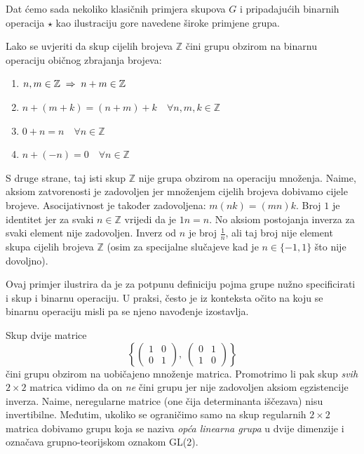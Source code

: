 Dat ćemo sada nekoliko klasičnih primjera skupova $G$ i pripadajućih
binarnih operacija $\star$ kao ilustraciju gore navedene široke primjene grupa.

\begin{primjer}[$\mathbb{Z}$, +]
 Lako se uvjeriti da skup cijelih brojeva $\mathbb{Z}$ čini grupu obzirom
 na binarnu operaciju običnog zbrajanja brojeva:
\begin{enumerate}
\item $n,m \in  \mathbb{Z} \;\Rightarrow\; n+m \in  \mathbb{Z}$
\item $n+(m+k)=(n+m)+k \quad \forall n,m,k \in \mathbb{Z}$
\item $0+n=n \quad \forall n\in\mathbb{Z}$ \quad {}
\item $n+(-n)=0 \quad \forall n\in\mathbb{Z}$  \quad {}
\end{enumerate}
\end{primjer}

\begin{primjer}
S druge strane, taj isti skup $\mathbb{Z}$ nije grupa obzirom na
operaciju množenja. Naime, aksiom zatvorenosti je zadovoljen jer
množenjem cijelih brojeva dobivamo cijele brojeve. Asocijativnost
je također zadovoljena: $m(nk)=(mn)k$. Broj $1$ je identitet jer
za svaki $n\in\mathbb{Z}$ vrijedi da je $1n=n$.
No aksiom postojanja inverza za svaki element nije zadovoljen.
Inverz od $n$ je broj $\frac{1}{n}$, ali taj broj nije element
skupa cijelih brojeva $\mathbb{Z}$ (osim za specijalne slučajeve
kad je $n\in\{-1, 1\}$ što nije dovoljno).
\end{primjer}

Ovaj primjer ilustrira da je za potpunu definiciju pojma grupe nužno
specificirati i skup i binarnu operaciju. U praksi, često je iz konteksta
očito na koju se binarnu operaciju misli pa se njeno navođenje izostavlja.

\begin{primjer}
    \label{th:dvijemat}
Skup dvije matrice
\[\left\{
\begin{pmatrix}
1 & 0 \\ 0 & 1
\end{pmatrix}, \;
\begin{pmatrix}
0 & 1 \\ 1 & 0
\end{pmatrix}
\right\} \]
čini grupu obzirom na uobičajeno množenje matrica. Promotrimo li pak skup
\emph{svih} $2\times2$ matrica vidimo da on \emph{ne} čini grupu jer nije
zadovoljen aksiom egzistencije inverza. Naime, neregularne matrice (one
čija determinanta iščezava) nisu invertibilne. Međutim, ukoliko se
ograničimo samo na skup regularnih  $2\times2$ matrica dobivamo grupu
koja se naziva \emph{opća linearna grupa} u dvije dimenzije i označava
grupno-teorijskom oznakom GL(2).
\end{primjer}

